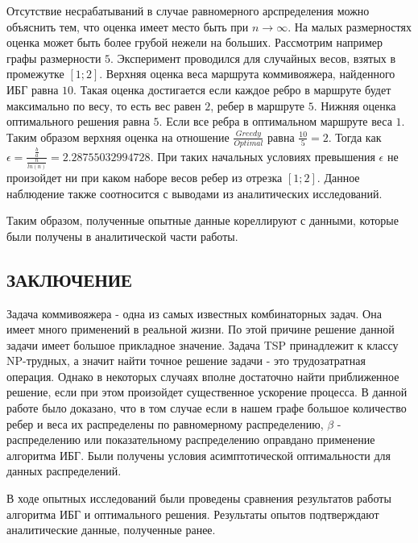 \documentclass[a4paper, 14pt]{extarticle}
\numberwithin{equation}{section}
\begin{document}
Отсутствие несрабатываний в случае равномерного арспределения можно объяснить тем, что оценка имеет место быть при $n \rightarrow \infty$. На малых размерностях оценка может быть более грубой нежели на больших. Рассмотрим например графы размерности $5$. Эксперимент проводился для случайных весов, взятых в промежутке $[1;2]$. Верхняя оценка веса маршрута коммивояжера, найденного ИБГ равна $10$. Такая оценка достигается если каждое ребро в маршруте будет максимально по весу, то есть вес равен $2$, ребер в маршруте $5$. Нижняя оценка оптимального решения равна $5$. Если все ребра в оптимальном маршруте веса $1$. Таким образом верхняя оценка на отношение $\frac{Greedy}{Optimal}$ равна $\frac{10}{5} = 2$. Тогда как $\epsilon = \frac{\frac{b}{a}}{\frac{n}{ln(n)}} = 2.28755032994728$. При таких начальных условиях превышения $\epsilon$ не произойдет ни при каком наборе весов ребер из отрезка $[1;2]$. Данное наблюдение также соотносится с выводами из аналитических исследований.

Таким образом, полученные опытные данные кореллируют с данными, которые были получены в аналитической части работы.

\newpage

\begin{center}
\chapter{\textbf{ЗАКЛЮЧЕНИЕ}}
\end{center}

Задача коммивояжера - одна из самых известных комбинаторных задач. 
Она имеет много применений в реальной жизни. По этой причине решение данной задачи имеет большое прикладное значение. Задача TSP принадлежит к классу NP-трудных, а значит найти точное решение задачи - это трудозатратная операция. Однако в некоторых случаях вполне достаточно найти приближенное решение, если при этом произойдет существенное ускорение процесса. В данной работе было доказано, что в том случае если в нашем графе большое количество ребер и веса их распределены по равномерному распределению, $\beta$ - распределению или показательному распределению оправдано применение алгоритма ИБГ. Были получены условия асимптотической оптимальности для данных распределений.

В ходе опытных исследований были проведены сравнения результатов работы алгоритма ИБГ и оптимального решения. Результаты опытов подтверждают аналитические данные, полученные ранее.
\end{document}
